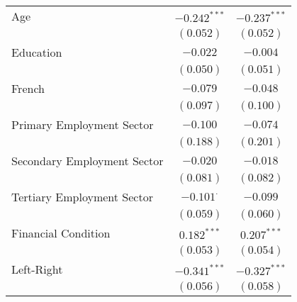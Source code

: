 \begin{center}
\begin{tiny}
\begin{longtable}{l@{} c@{} c@{}}
\quad Age                                                                            & $-0.242^{***}$   & $-0.237^{***}$   \\
                                                                                     & $(0.052)$        & $(0.052)$        \\
\quad Education                                                                      & $-0.022$         & $-0.004$         \\
                                                                                     & $(0.050)$        & $(0.051)$        \\
\quad French                                                                         & $-0.079$         & $-0.048$         \\
                                                                                     & $(0.097)$        & $(0.100)$        \\
\quad Primary Employment Sector                                                      & $-0.100$         & $-0.074$         \\
                                                                                     & $(0.188)$        & $(0.201)$        \\
\quad Secondary Employment Sector                                                    & $-0.020$         & $-0.018$         \\
                                                                                     & $(0.081)$        & $(0.082)$        \\
\quad Tertiary Employment Sector                                                     & $-0.101^{\cdot}$ & $-0.099$         \\
                                                                                     & $(0.059)$        & $(0.060)$        \\
\quad Financial Condition                                                            & $0.182^{***}$    & $0.207^{***}$    \\
                                                                                     & $(0.053)$        & $(0.054)$        \\
\quad Left-Right                                                                     & $-0.341^{***}$   & $-0.327^{***}$   \\
                                                                                     & $(0.056)$        & $(0.058)$        \\

\end{longtable}
\end{tiny}
\end{center}
